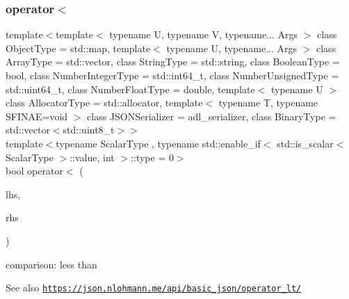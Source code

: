 \subsubsection{\texorpdfstring{operator$<$}{operator<}\hspace{0.1cm}{\footnotesize\ttfamily [2/3]}}
{\footnotesize\ttfamily template$<$template$<$ typename U, typename V, typename... Args $>$ class Object\+Type = std\+::map, template$<$ typename U, typename... Args $>$ class Array\+Type = std\+::vector, class String\+Type  = std\+::string, class Boolean\+Type  = bool, class Number\+Integer\+Type  = std\+::int64\+\_\+t, class Number\+Unsigned\+Type  = std\+::uint64\+\_\+t, class Number\+Float\+Type  = double, template$<$ typename U $>$ class Allocator\+Type = std\+::allocator, template$<$ typename T, typename S\+F\+I\+N\+A\+E=void $>$ class J\+S\+O\+N\+Serializer = adl\+\_\+serializer, class Binary\+Type  = std\+::vector$<$std\+::uint8\+\_\+t$>$$>$ \\
template$<$typename Scalar\+Type , typename std\+::enable\+\_\+if$<$ std\+::is\+\_\+scalar$<$ Scalar\+Type $>$\+::value, int $>$\+::type  = 0$>$ \\
bool operator$<$ (\begin{DoxyParamCaption}\item[{\hyperlink{classnlohmann_1_1basic__json_ab8a1c33ee7b154fc41ca2545aa9724e6}{const\+\_\+reference}}]{lhs,  }\item[{Scalar\+Type}]{rhs }\end{DoxyParamCaption})\hspace{0.3cm}{\ttfamily [friend]}}



comparison\+: less than 

\begin{DoxySeeAlso}{See also}
\href{https://json.nlohmann.me/api/basic_json/operator_lt/}{\tt https\+://json.\+nlohmann.\+me/api/basic\+\_\+json/operator\+\_\+lt/} 
\end{DoxySeeAlso}
\mbox{\label{classnlohmann_1_1basic__json_a71f65ff3abee4c140e27ca64fa327973}} 

